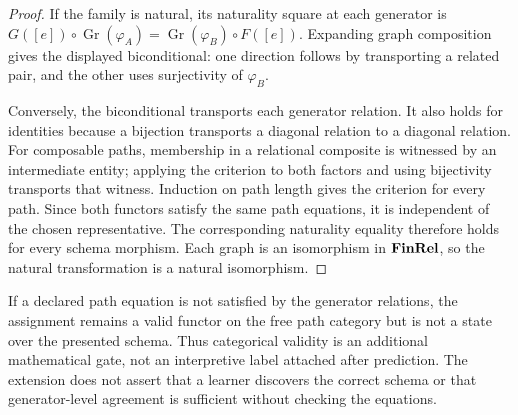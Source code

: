 \begin{proof}
If the family is natural, its naturality square at each generator is
$G([e])\circ\operatorname{Gr}(\varphi_A)
=\operatorname{Gr}(\varphi_B)\circ F([e])$. Expanding graph
composition gives the displayed biconditional: one direction follows by
transporting a related pair, and the other uses surjectivity of
$\varphi_B$.

Conversely, the biconditional transports each generator relation. It also
holds for identities because a bijection transports a diagonal relation to a
diagonal relation. For composable paths, membership in a relational composite
is witnessed by an intermediate entity; applying the criterion to both factors
and using bijectivity transports that witness. Induction on path length gives
the criterion for every path. Since both functors satisfy the same path
equations, it is independent of the chosen representative. The corresponding
naturality equality therefore holds for every schema morphism. Each graph is
an isomorphism in $\mathbf{FinRel}$, so the natural transformation is a natural
isomorphism.
\end{proof}

If a declared path equation is not satisfied by the generator relations, the
assignment remains a valid functor on the free path category but is not a
state over the presented schema. Thus categorical validity is an additional
mathematical gate, not an interpretive label attached after prediction.
The extension does not assert that a learner discovers the correct schema or
that generator-level agreement is sufficient without checking the equations.
